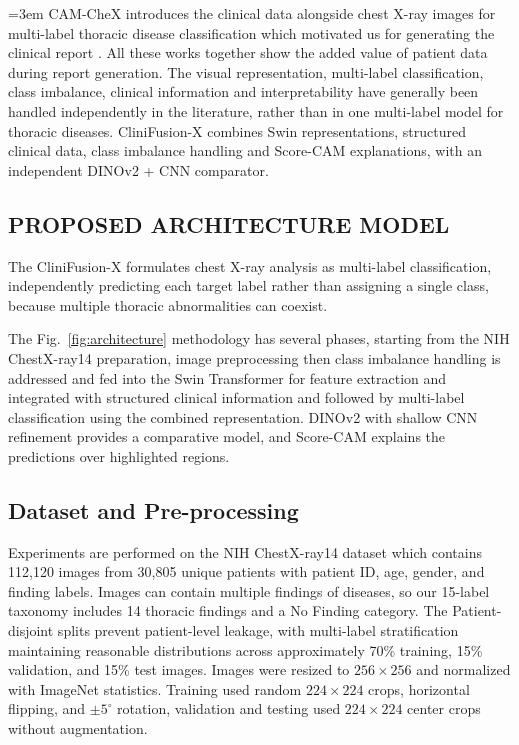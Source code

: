 \documentclass[conference]{IEEEtran}
\begin{document}
{\emergencystretch=3em
CAM-CheX introduces the clinical data alongside chest X-ray images for multi-label thoracic disease classification which motivated us for generating the clinical report \citep{pmlr-v297-sloan26a}.
All these works together show the added value of patient data during report generation. The visual representation, multi-label classification, class imbalance, clinical information and interpretability have generally been handled independently in the literature, rather than in one multi-label model for thoracic diseases. CliniFusion-X combines Swin representations, structured clinical data, class imbalance handling and Score-CAM explanations, with an independent DINOv2 + CNN comparator.\par}
\begin{strip}
    \noindent\begin{minipage}{\columnwidth}
        \section{PROPOSED ARCHITECTURE MODEL}
    \end{minipage}\par\medskip
    \centering
    \resizebox{\textwidth}{!}{}

    \label{fig:architecture}
\end{strip}
The CliniFusion-X formulates chest X-ray analysis as multi-label classification, independently predicting each target label rather than assigning a single class, because multiple thoracic abnormalities can coexist.

The Fig.~\ref{fig:architecture} methodology has several phases, starting from the NIH ChestX-ray14 preparation,
image preprocessing then class imbalance handling is addressed and fed into the Swin Transformer for 
feature extraction and integrated with structured clinical information and followed by multi-label classification using the combined representation. DINOv2 with shallow CNN refinement provides a comparative model, and Score-CAM explains the predictions over highlighted regions.
\subsection{\textbf{Dataset and Pre-processing}}
Experiments are performed on the NIH ChestX-ray14 dataset which contains 112,120 images from 30,805 unique patients with patient ID, age, gender, and finding labels. Images can contain multiple findings of diseases, so our 15-label taxonomy includes 14 thoracic findings and a No Finding category. The Patient-disjoint splits prevent patient-level leakage, with multi-label stratification maintaining reasonable distributions across approximately 70\% training, 15\% validation, and 15\% test images. Images were resized to $256 \times 256$ and normalized with ImageNet statistics. Training used random $224 \times 224$ crops, horizontal flipping, and $\pm5^\circ$ rotation, validation and testing used $224 \times 224$ center crops without augmentation.
\end{document}
